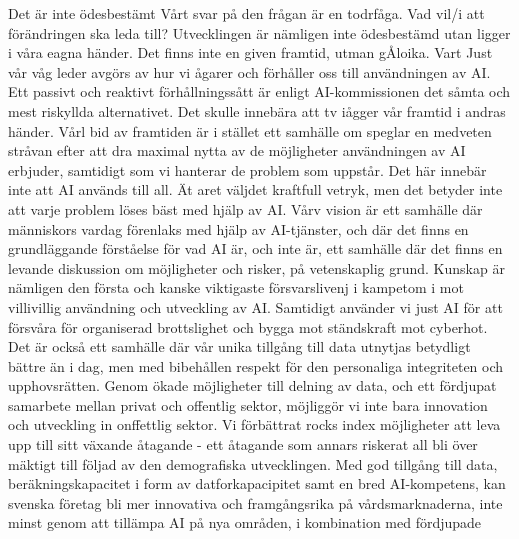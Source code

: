 {Det är inte ödesbestämt
Vårt svar på den frågan är en todrfåga. Vad vil/i att förändringen ska leda till? Utvecklingen är nämligen inte ödesbestämd utan ligger i våra eagna händer. Det finns inte en given framtid, utman gÅloika. Vart Just vår våg leder avgörs av hur vi ågarer och förhåller oss till användningen av AI. Ett passivt och reaktivt förhållningssått är enligt AI-kommissionen det såmta och mest riskyllda alternativet. Det skulle innebära att tv iågger vår framtid i andras händer.
Vårl bid av framtiden är i stället ett samhälle om speglar en medveten stråvan efter att dra maximal nytta av de möjligheter användningen av AI erbjuder, samtidigt som vi hanterar de problem som uppstår. Det här innebär inte att AI används till all. Ät aret väljdet kraftfull vetryk, men det betyder inte att varje problem löses bäst med hjälp av AI.
Vårv vision är ett samhälle där människors vardag förenlaks med hjälp av AI-tjänster, och där det finns en grundläggande förståelse för vad AI är, och inte är, ett samhälle där det finns en levande diskussion om möjligheter och risker, på vetenskaplig grund. Kunskap är nämligen den första och kanske viktigaste försvarslivenj i kampetom i mot villivillig användning och utveckling av AI. Samtidigt använder vi just AI för att försvåra för organiserad brottslighet och bygga mot ständskraft mot cyberhot.
Det är också ett samhälle där vår unika tillgång till data utnytjas betydligt bättre än i dag, men med bibehållen respekt för den personaliga integriteten och upphovsrätten. Genom ökade möjligheter till delning av data, och ett fördjupat samarbete mellan privat och offentlig sektor, möjliggör vi inte bara innovation och utveckling in onffettlig sektor. Vi förbättrat rocks index möjligheter att leva upp till sitt växande åtagande - ett åtagande som annars riskerat all bli över mäktigt till följad av den demografiska utvecklingen.
Med god tillgång till data, beräkningskapacitet i form av datforkapacipitet samt en bred AI-kompetens, kan svenska företag bli mer innovativa och framgångsrika på vårdsmarknaderna, inte minst genom att tillämpa AI på nya områden, i kombination med fördjupade

}
